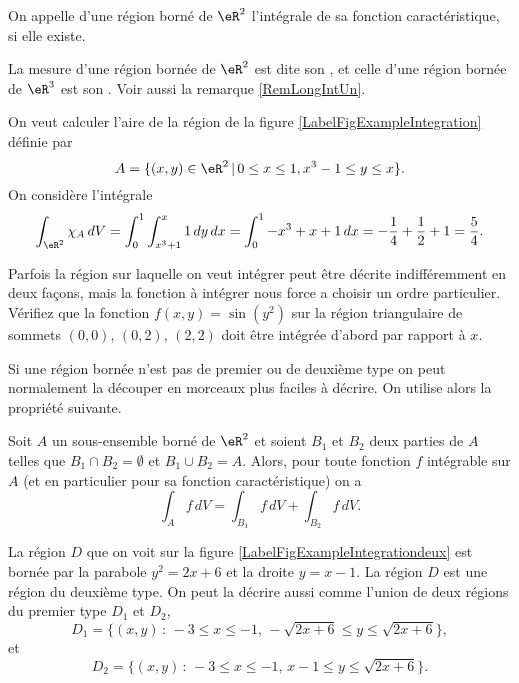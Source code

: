 \begin{definition}		\label{DefMesureInt}
	On appelle  d'une région borné de  $\eR^2$  l'intégrale de sa fonction caractéristique, si elle existe.  
\end{definition}
La mesure d'une région bornée de $\eR^2$ est dite son , et celle d'une région bornée de $\eR^3$ est son . Voir aussi la remarque \ref{RemLongIntUn}.


\begin{example}\label{exint}
  On veut calculer l'aire de la région de la figure \ref{LabelFigExampleIntegration} définie par 
\[
A=\{(x,y)\in\eR^2\,\vert\, 0\leq x\leq 1, x^3-1\leq y\leq x \}.
\]
On considère l'intégrale 
\[
\int_{\eR^2} \chi_{A}\, dV= \int_0^1\int^{x}_{x^3+1} 1 \, dy\, dx= \int_0^1 -x^3+x+1\, dx= -\frac{1}{4}+\frac{1}{2}+1=\frac{5}{4}.
\]
\end{example}
\newcommand{\CaptionFigExampleIntegration}{La région $A$ de l'exemple \ref{exint}}


\begin{exercice}

  Parfois la région sur laquelle on veut intégrer peut être décrite indifféremment en deux façons, mais la fonction à intégrer nous force a choisir un ordre particulier. Vérifiez que la fonction $f(x,y)=\sin(y^2)$ sur la région triangulaire de sommets $(0,0)$, $(0, 2)$, $(2,2)$ doit être intégrée d'abord par rapport à $x$.     
\end{exercice}

Si une région bornée n'est pas de premier ou de deuxième type on peut normalement la découper en morceaux plus faciles à décrire. On utilise alors la propriété suivante. 
\begin{lemma}
  Soit $A$ un sous-ensemble borné de $\eR^2$ et soient $B_1$ et $B_2$ deux parties de $A$ telles que $B_1\cap B_2=\emptyset$ et $B_1\cup B_2= A$. Alors, pour toute fonction $f$ intégrable sur $A$ (et en particulier pour sa fonction caractéristique) on a
\[
\int_{A}f \, dV= \int_{B_1}f \, dV+\int_{B_2}f \, dV.
\] 
\end{lemma}
\begin{example}\label{exint2}
  La région $D$ que on voit sur la figure \ref{LabelFigExampleIntegrationdeux} est  bornée par la parabole $y^2=2x+6$ et la droite $y=x-1$. La région $D$ est une région du deuxième type. On peut la décrire aussi comme l'union de deux régions du premier type $D_1$ et $D_2$,
\[
D_1=\{(x,y)\,:\, -3\leq x \leq -1,\, -\sqrt{2x+6}\leq y \leq \sqrt{2x+6}\},
\]
 et 
\[
D_2=\{(x,y)\,:\, -3\leq x \leq -1, \, x-1\leq y \leq \sqrt{2x+6}\}.
\]
\newcommand{\CaptionFigExampleIntegrationdeux}{La région $D$ de l'exemple \ref{exint2}}

\end{example}
